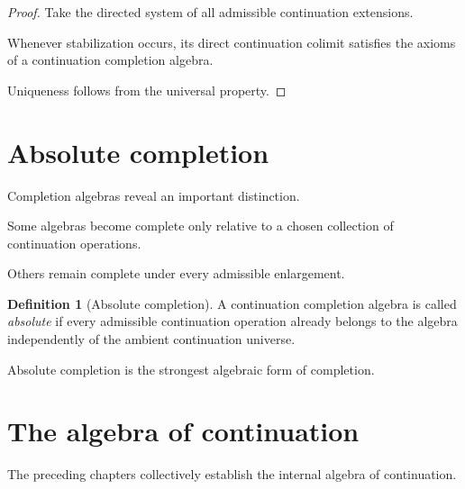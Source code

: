 \documentclass[13pt,openany]{book}
\theoremstyle{plain}
\theoremstyle{definition}
\newtheorem{definition}{Definition}[chapter]
\begin{document}
\begin{proof}

Take the directed system of all admissible continuation extensions.

Whenever stabilization occurs, its direct continuation colimit satisfies the
axioms of a continuation completion algebra.

Uniqueness follows from the universal property.

\end{proof}

\section{Absolute completion}

Completion algebras reveal an important distinction.

Some algebras become complete only relative to a chosen collection of
continuation operations.

Others remain complete under every admissible enlargement.

\begin{definition}[Absolute completion]

A continuation completion algebra is called \emph{absolute} if every admissible
continuation operation already belongs to the algebra independently of the
ambient continuation universe.

\end{definition}

Absolute completion is the strongest algebraic form of completion.

\section{The algebra of continuation}

The preceding chapters collectively establish the internal algebra of
continuation.
\end{document}
